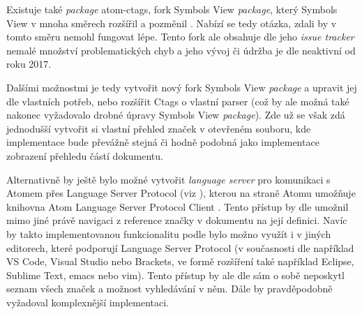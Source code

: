 Existuje také \textit{package} atom-ctags, fork Symbols View \textit{package}, který Symbols View v mnoha směrech
rozšířil a pozměnil \cite{atom-package-atom-ctags-github}. Nabízí se tedy otázka, zdali by v tomto směru nemohl fungovat
lépe. Tento fork ale obsahuje dle jeho \textit{issue tracker} \cite{atom-package-atom-ctags-github} nemalé množství
problematických chyb a jeho vývoj či údržba je dle \cite{atom-package-atom-ctags-github} neaktivní od roku 2017.

\begin{sloppypar}
Dalšími možnostmi je tedy vytvořit nový fork Symbols View \textit{package} a upravit jej dle vlastních potřeb, nebo
rozšířit Ctags o vlastní parser (což by ale možná také nakonec vyžadovalo drobné úpravy Symbols View \textit{package}).
Zde už se však zdá jednodušší vytvořit si vlastní přehled značek v otevřeném souboru, kde implementace bude převážně
stejná či hodně podobná jako implementace zobrazení přehledu částí dokumentu.
\end{sloppypar}

Alternativně by ještě bylo možné vytvořit \textit{language server} pro komunikaci s Atomem přes Language Server
Protocol (viz \cite{lsp-docs}), kterou na straně Atomu umožňuje knihovna Atom Language Server Protocol Client
\cite{atom-lsp-client-github}. Tento přístup by dle \cite{atom-lsp-client-github} umožnil mimo jiné právě navigaci z
reference značky v dokumentu na její definici. Navíc by takto implementovanou funkcionalitu podle \cite{lsp-docs} bylo
možno využít i v jiných editorech, které podporují Language Server Protocol (v současnosti dle \cite{lsp-docs} například
VS Code, Visual Studio nebo Brackets, ve formě rozšíření také například Eclipse, Sublime Text, emacs nebo vim). Tento
přístup by ale dle \cite{atom-lsp-client-github} sám o sobě neposkytl seznam všech značek a možnost vyhledávání v něm.
Dále by pravděpodobně vyžadoval komplexnější implementaci.
